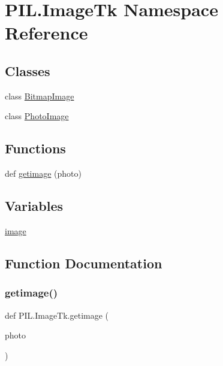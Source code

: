 \hypertarget{namespacePIL_1_1ImageTk}{}\section{P\+I\+L.\+Image\+Tk Namespace Reference}
\label{namespacePIL_1_1ImageTk}
\subsection*{Classes}
\begin{DoxyCompactItemize}
\item 
class \hyperlink{classPIL_1_1ImageTk_1_1BitmapImage}{Bitmap\+Image}
\item 
class \hyperlink{classPIL_1_1ImageTk_1_1PhotoImage}{Photo\+Image}
\end{DoxyCompactItemize}
\subsection*{Functions}
\begin{DoxyCompactItemize}
\item 
def \hyperlink{namespacePIL_1_1ImageTk_a77452a8a47a64258cef656461a6003de}{getimage} (photo)
\end{DoxyCompactItemize}
\subsection*{Variables}
\begin{DoxyCompactItemize}
\item 
\hyperlink{namespacePIL_1_1ImageTk_aa639552cd8cb63f42e281f4f5358ed5f}{image}
\end{DoxyCompactItemize}


\subsection{Function Documentation}
\mbox{\label{namespacePIL_1_1ImageTk_a77452a8a47a64258cef656461a6003de}} 
\subsubsection{\texorpdfstring{getimage()}{getimage()}}
{\footnotesize\ttfamily def P\+I\+L.\+Image\+Tk.\+getimage (\begin{DoxyParamCaption}\item[{}]{photo }\end{DoxyParamCaption})}

